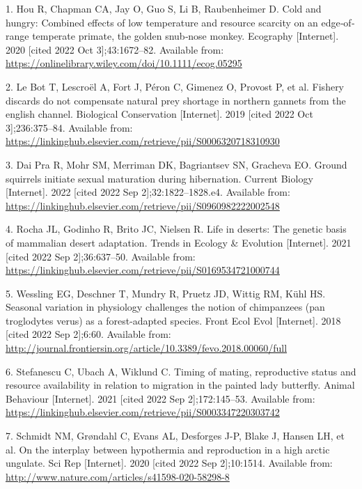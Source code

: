 \documentclass[
  12pt,
]{article}
\newlength{\cslhangindent}
\newenvironment{CSLReferences}[2] %
 {\begin{list}{}{%
  \setlength{\itemindent}{0pt}
  \setlength{\leftmargin}{0pt}
  \setlength{\parsep}{0pt}
  \ifodd #1
   \setlength{\leftmargin}{\cslhangindent}
   \setlength{\itemindent}{-1\cslhangindent}
  \fi
  \setlength{\itemsep}{#2\baselineskip}}}
 {\end{list}}
\begin{document}
\label{refs}
\begin{CSLReferences}{0}{1}
1. Hou R, Chapman CA, Jay O, Guo S, Li B, Raubenheimer D. Cold and hungry: Combined effects of low temperature and resource scarcity on an edge‐of‐range temperate primate, the golden snub‐nose monkey. Ecography {[}Internet{]}. 2020 {[}cited 2022 Oct 3{]};43:1672--82. Available from: \url{https://onlinelibrary.wiley.com/doi/10.1111/ecog.05295}

2. Le Bot T, Lescroël A, Fort J, Péron C, Gimenez O, Provost P, et al. Fishery discards do not compensate natural prey shortage in northern gannets from the english channel. Biological Conservation {[}Internet{]}. 2019 {[}cited 2022 Oct 3{]};236:375--84. Available from: \url{https://linkinghub.elsevier.com/retrieve/pii/S0006320718310930}

3. Dai Pra R, Mohr SM, Merriman DK, Bagriantsev SN, Gracheva EO. Ground squirrels initiate sexual maturation during hibernation. Current Biology {[}Internet{]}. 2022 {[}cited 2022 Sep 2{]};32:1822--1828.e4. Available from: \url{https://linkinghub.elsevier.com/retrieve/pii/S0960982222002548}

4. Rocha JL, Godinho R, Brito JC, Nielsen R. Life in deserts: The genetic basis of mammalian desert adaptation. Trends in Ecology \& Evolution {[}Internet{]}. 2021 {[}cited 2022 Sep 2{]};36:637--50. Available from: \url{https://linkinghub.elsevier.com/retrieve/pii/S0169534721000744}

5. Wessling EG, Deschner T, Mundry R, Pruetz JD, Wittig RM, Kühl HS. Seasonal variation in physiology challenges the notion of chimpanzees (pan troglodytes verus) as a forest-adapted species. Front Ecol Evol {[}Internet{]}. 2018 {[}cited 2022 Sep 2{]};6:60. Available from: \url{http://journal.frontiersin.org/article/10.3389/fevo.2018.00060/full}

6. Stefanescu C, Ubach A, Wiklund C. Timing of mating, reproductive status and resource availability in relation to migration in the painted lady butterfly. Animal Behaviour {[}Internet{]}. 2021 {[}cited 2022 Sep 2{]};172:145--53. Available from: \url{https://linkinghub.elsevier.com/retrieve/pii/S0003347220303742}

7. Schmidt NM, Grøndahl C, Evans AL, Desforges J-P, Blake J, Hansen LH, et al. On the interplay between hypothermia and reproduction in a high arctic ungulate. Sci Rep {[}Internet{]}. 2020 {[}cited 2022 Sep 2{]};10:1514. Available from: \url{http://www.nature.com/articles/s41598-020-58298-8}


\end{CSLReferences}
\end{document}
